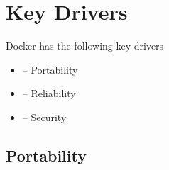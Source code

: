 
\section{Key Drivers}
\label{sec:keydrivers}


Docker has the following key drivers
\begin{itemize}
	\item {}-- Portability
	\item {}-- Reliability
	\item {}-- Security
\end{itemize}
%
\subsection{Portability}
%
%


